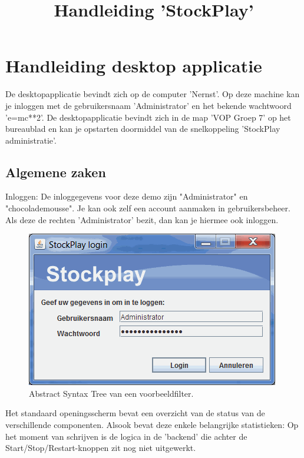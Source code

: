 \title{Handleiding 'StockPlay'}
\chapter{Handleiding desktop applicatie}

De desktopapplicatie bevindt zich op de computer 'Nernst'.
Op deze machine kan je inloggen met de gebruikersnaam 'Administrator' en het bekende wachtwoord 'e=mc**2'.
De desktopapplicatie bevindt zich in de map 'VOP Groep 7' op het bureaublad en kan je opstarten doormiddel van de snelkoppeling 'StockPlay administratie'.

\section{Algemene zaken}

Inloggen:
De inloggegevens voor deze demo zijn "Administrator" en "chocolademousse". Je kan ook zelf een account aanmaken in gebruikersbeheer. Als deze de rechten 'Administrator' bezit, dan kan je hiermee ook inloggen.

\begin{figure}[h!]
	\centering
		\includegraphics[width=\textwidth]{images/handleiding/handleiding1.png}
	\caption{Abstract Syntax Tree van een voorbeeldfilter.}
\end{figure}

Het standaard openingsscherm bevat een overzicht van de status van de verschillende componenten.
Alsook bevat deze enkele belangrijke statistieken:
Op het moment van schrijven is de logica in de 'backend' die achter de Start/Stop/Restart-knoppen zit nog niet uitgewerkt.

